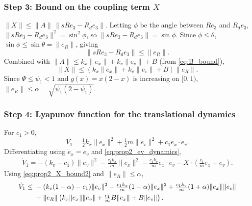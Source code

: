\documentclass[11pt]{article}
\theoremstyle{remark}
\begin{document}
\subsubsection*{Step 3: Bound on the coupling term $X$}
$\|X\| \le \|A\|\,\|sRe_3 - R_de_3\|$. Letting $\phi$ be the angle between $Re_3$ and $R_de_3$, $\|sRe_3 - R_de_3\|^2 = \sin^2\phi$, so $\|sRe_3 - R_de_3\| = \sin\phi$. Since $\phi \le \theta$, $\sin\phi \le \sin\theta = \|e_R\|$, giving
\[
\|sRe_3 - R_de_3\| \le \|e_R\|.
\]
Combined with $\|A\| \le k_x\|e_x\| + k_v\|e_v\| + B$ (from \eqref{eq:B_bound}),
\begin{equation}
\|X\| \le (k_x\|e_x\| + k_v\|e_v\| + B)\|e_R\|.
\label{eq:prop2_X_bound2}
\end{equation}
Since $\Psi \le \psi_1 < 1$ and $g(x) = x(2-x)$ is increasing on $[0,1)$, $\|e_R\| \le \alpha = \sqrt{\psi_1(2-\psi_1)}$.

\subsubsection*{Step 4: Lyapunov function for the translational dynamics}
For $c_1 > 0$,
\begin{equation}
V_1 = \tfrac{1}{2}k_x\|e_x\|^2 + \tfrac{1}{2}m\|e_v\|^2 + c_1 e_x\cdot e_v.
\label{eq:prop2_V1}
\end{equation}
Differentiating using $\dot e_x = e_v$ and \eqref{eq:prop2_ev_dynamics},
\begin{align}
\dot V_1 = -(k_v-c_1)\|e_v\|^2 - \tfrac{c_1k_x}{m}\|e_x\|^2 - \tfrac{c_1k_v}{m}e_x\cdot e_v - X\cdot\!\left(\tfrac{c_1}{m}e_x + e_v\right).
\label{eq:prop2_V1dot_exact}
\end{align}
Using \eqref{eq:prop2_X_bound2} and $\|e_R\| \le \alpha$,
\begin{align}
\dot V_1 \le\; &-(k_v(1-\alpha)-c_1)\|e_v\|^2 - \tfrac{c_1k_x}{m}(1-\alpha)\|e_x\|^2 + \tfrac{c_1k_v}{m}(1+\alpha)\|e_x\|\|e_v\|\notag\\
&+ \|e_R\|\left(k_x\|e_x\|\|e_v\| + \tfrac{c_1}{m}B\|e_x\| + B\|e_v\|\right).
\label{eq:prop2_V1dot_bound}
\end{align}
\end{document}
